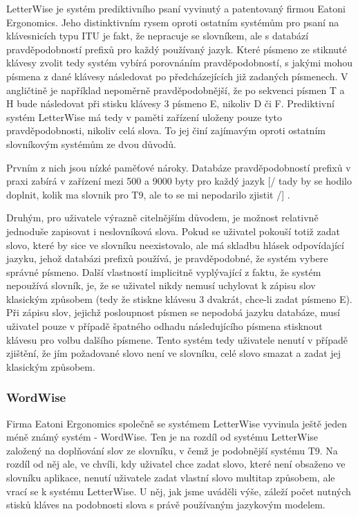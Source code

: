 \documentclass{article}
\begin{document}
LetterWise je systém prediktivního psaní vyvinutý a patentovaný firmou Eatoni Ergonomics. Jeho distinktivním rysem oproti ostatním systémům pro psaní na klávesnicích typu ITU je fakt, že nepracuje se slovníkem, ale s databází pravděpodobností prefixů pro každý používaný jazyk. Které písmeno ze stiknuté klávesy zvolit tedy systém vybírá porovnáním pravděpodobností, s jakými mohou písmena z dané klávesy následovat po předcházejících již zadaných písmenech. V angličtině je například nepoměrně pravděpodobnější, že po sekvenci písmen T a H bude následovat při stisku klávesy 3 písmeno E, nikoliv D či F. Prediktivní systém LetterWise má tedy v paměti zařízení uloženy pouze tyto pravděpodobnosti, nikoliv celá slova. \cite{MacKenzie2001} To jej činí zajímavým oproti ostatním slovníkovým systémům ze dvou důvodů.

Prvním z nich jsou nízké paměťové nároky. Databáze pravděpodobností prefixů v praxi zabírá v zařízení mezi 500 a 9000 byty pro každý jazyk 
[/ tady by se hodilo doplnit, kolik ma slovnik pro T9, ale to se mi nepodarilo zjistit /]
.  

Druhým, pro uživatele výrazně citelnějším důvodem, je možnost relativně jednoduše zapisovat i neslovníková slova. Pokud se uživatel pokouší totiž zadat slovo, které by sice ve slovníku neexistovalo, ale má skladbu hlásek odpovídající jazyku, jehož databázi prefixů používá, je pravděpodobné, že systém vybere správné písmeno. Další vlastností implicitně vyplývající z faktu, že systém nepoužívá slovník, je, že se uživatel nikdy nemusí uchylovat k zápisu slov klasickým způsobem (tedy že stiskne klávesu 3 dvakrát, chce-li zadat písmeno E). Při zápisu slov, jejichž posloupnost písmen se nepodobá jazyku databáze, musí uživatel pouze v případě špatného odhadu následujícího písmena stisknout klávesu pro volbu dalšího písmene. Tento systém tedy uživatele nenutí v případě zjištění, že jím požadované slovo není ve slovníku, celé slovo smazat a zadat jej klasickým způsobem. \cite{MacKenzie2001} \cite{Ghayoomi2009} 


\subsubsection{WordWise}

Firma Eatoni Ergonomics společně se systémem LetterWise vyvinula ještě jeden méně známý systém - WordWise. Ten je na rozdíl od systému LetterWise založený na doplňování slov ze slovníku, v čemž je podobnější systému T9. Na rozdíl od něj ale, ve chvíli, kdy uživatel chce zadat slovo, které není obsaženo ve slovníku aplikace, nenutí uživatele zadat vlastní slovo multitap způsobem, ale vrací se k systému LetterWise. U něj, jak jsme uváděli výše, záleží počet nutných stisků kláves na podobnosti slova s právě používaným jazykovým modelem. 
\end{document}
